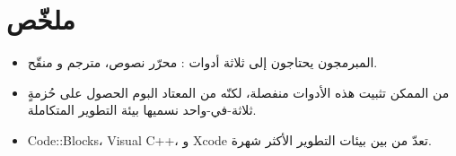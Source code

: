 \section*{ملخّص}

\begin{itemize}
  \item المبرمجون يحتاجون إلى ثلاثة أدوات : محرّر نصوص، مترجم و منقّح.
  \item من الممكن تثبيت هذه الأدوات منفصلة، لكنّه من المعتاد البوم الحصول على حُزمةٍ ثلاثة-في-واحد نسميها بيئة التطوير المتكاملة.
  \item \textenglish{Code::Blocks}،
\textenglish{Visual C++}،
و
\textenglish{Xcode}
تعدّ من بين بيئات التطوير الأكثر شهرة.
\end{itemize}
